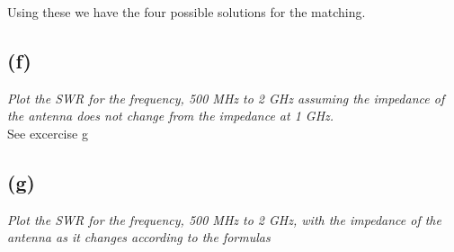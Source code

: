 Using these we have the four possible solutions for the matching. 

\subsection{(f)}
\textit{Plot the SWR for the frequency, 500 MHz to 2 GHz assuming the impedance of the antenna does not
change from the impedance at 1 GHz.}\\

See excercise g

\subsection{(g)}
\textit{Plot the SWR for the frequency, 500 MHz to 2 GHz, with the impedance of the antenna as it changes
according to the formulas}\\

